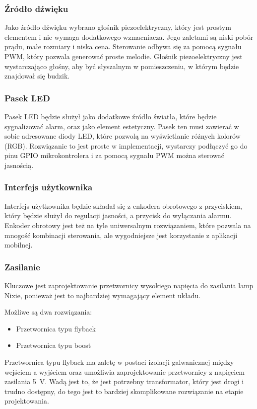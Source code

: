 \documentclass[../main.tex]{subfiles}
\begin{document}
\subsubsection{Źródło dźwięku}
Jako źródło dźwięku wybrano głośnik piezoelektryczny, który jest prostym elementem i nie wymaga dodatkowego wzmacniacza. Jego zaletami są niski pobór prądu, małe rozmiary i niska cena.
Sterowanie odbywa się za pomocą sygnału PWM, który pozwala generować proste melodie. Głośnik piezoelektryczny jest wystarczająco głośny,
aby być słyszalnym w pomieszczeniu, w którym będzie znajdował się budzik.

\subsubsection{Pasek LED}
Pasek LED będzie służył jako dodatkowe źródło światła, które będzie sygnalizować alarm, oraz jako element estetyczny. Pasek ten musi 
zawierać w sobie adresowane diody LED, które pozwolą na wyświetlanie różnych kolorów (RGB).
Rozwiązanie to jest proste w implementacji, wystarczy podłączyć go do pinu GPIO mikrokontrolera i za pomocą sygnału PWM można sterować jasnością.

\subsubsection{Interfejs użytkownika}
Interfejs użytkownika będzie składał się z enkodera obrotowego z przyciskiem, który będzie służył do regulacji jasności, a przycisk do wyłączania alarmu.
Enkoder obrotowy jest też na tyle uniwersalnym rozwiązaniem, które pozwala na mnogość kombinacji sterowania, ale wygodniejsze jest korzystanie z aplikacji mobilnej.

\subsubsection{Zasilanie}
Kluczowe jest zaprojektowanie przetwornicy wysokiego napięcia do zasilania lamp Nixie, ponieważ jest to najbardziej wymagający element układu.

Możliwe są dwa rozwiązania:
\begin{itemize}
    \item Przetwornica typu flyback
    \item Przetwornica typu boost
\end{itemize}

Przetwornica typu flyback ma zaletę w postaci izolacji galwanicznej między wejściem a wyjściem oraz umożliwia zaprojektowanie przetwornicy z napięciem zasilania \SI{5}{\volt}. 
Wadą jest to, że jest potrzebny transformator, który jest drogi i trudno dostępny, do tego jest to bardziej skomplikowane rozwiązanie na etapie projektowania.
\end{document}
